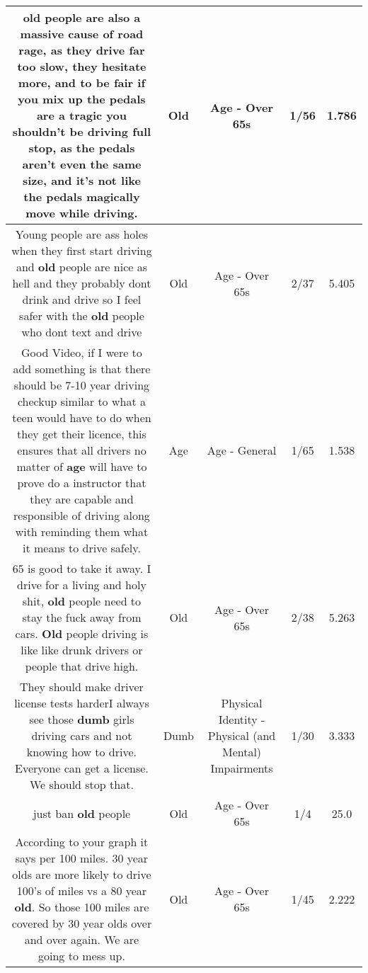 \documentclass[11pt]{article}
\newlength\mylength
\begin{document}
\begin{center}
\begin{longtable}{|C{.65\mylength}|C{.30\mylength}|C{.12\mylength}|C{.12\mylength}|C{.12\mylength}|}
  \small old people are also a massive cause of road rage, as they drive far too slow, they hesitate more,  and to be fair if you mix up the pedals are a tragic you shouldn't be driving full stop, as the pedals aren't even the same size, and it's not like the pedals magically move while driving.\normalsize   & Old & Age - Over 65s & 1/56 & 1.786 \\  \hline
  \small Young people are ass holes when they first start driving and \textbf{old} people are nice as hell and they probably dont drink and drive so I feel safer with the \textbf{old} people who dont text and drive\normalsize   & Old & Age - Over 65s & 2/37 & 5.405 \\  \hline
  \small Good Video, if I were to add something is that there should be 7-10 year driving checkup similar to what a teen would have to do when they get their licence, this ensures that all drivers no matter of \textbf{age} will have to prove do a instructor that they are capable and responsible of driving along with reminding them what it means to drive safely.\normalsize   & Age & Age - General & 1/65 & 1.538 \\  \hline
  \small 65 is good to take it away. I drive for a living and holy shit, \textbf{old} people need to stay the fuck away from cars. \textbf{Old} people driving is like like drunk drivers or people that drive high.\normalsize   & Old & Age - Over 65s & 2/38 & 5.263 \\  \hline
  \small They should make driver license tests harderI always see those \textbf{dumb} girls driving cars and not knowing how to drive. Everyone can get a license. We should stop that.\normalsize   & Dumb & Physical Identity - Physical (and Mental) Impairments & 1/30 & 3.333 \\  \hline
  \small just ban \textbf{old} people\normalsize   & Old & Age - Over 65s & 1/4 & 25.0 \\  \hline
  \small According to your graph it says per 100 miles. 30 year olds are more likely to drive 100's of miles vs a 80 year \textbf{old}. So those 100 miles are covered by 30 year olds over and over again. We are going to mess up.\normalsize   & Old & Age - Over 65s & 1/45 & 2.222 \\  \hline

\end{longtable}
\end{center}
\end{document}
